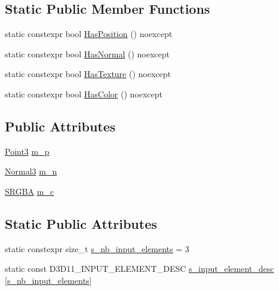 \subsection*{Static Public Member Functions}
\begin{DoxyCompactItemize}
\item 
static constexpr bool \hyperlink{structmage_1_1_vertex_position_normal_color_ae5e4ff514524b532f8c148a2f7e2cf8d}{Has\+Position} () noexcept
\item 
static constexpr bool \hyperlink{structmage_1_1_vertex_position_normal_color_a89924fd28326ffbe05b3b096f713937d}{Has\+Normal} () noexcept
\item 
static constexpr bool \hyperlink{structmage_1_1_vertex_position_normal_color_a9939ce4300e6dd0402abd299f55435ef}{Has\+Texture} () noexcept
\item 
static constexpr bool \hyperlink{structmage_1_1_vertex_position_normal_color_ab59f21c8f7ae5cef563365fc9b7d34c7}{Has\+Color} () noexcept
\end{DoxyCompactItemize}
\subsection*{Public Attributes}
\begin{DoxyCompactItemize}
\item 
\hyperlink{structmage_1_1_point3}{Point3} \hyperlink{structmage_1_1_vertex_position_normal_color_a4e5a4dff047da3d9b433a52d11584b54}{m\+\_\+p}
\item 
\hyperlink{structmage_1_1_normal3}{Normal3} \hyperlink{structmage_1_1_vertex_position_normal_color_aea2aa7191c054a17093310c20201020b}{m\+\_\+n}
\item 
\hyperlink{structmage_1_1_s_r_g_b_a}{S\+R\+G\+BA} \hyperlink{structmage_1_1_vertex_position_normal_color_a7d294a529c50b10832436dc456433a71}{m\+\_\+c}
\end{DoxyCompactItemize}
\subsection*{Static Public Attributes}
\begin{DoxyCompactItemize}
\item 
static constexpr size\+\_\+t \hyperlink{structmage_1_1_vertex_position_normal_color_ade9c12dfa6b8a61b58e0779e39d52801}{s\+\_\+nb\+\_\+input\+\_\+elements} = 3
\item 
static const D3\+D11\+\_\+\+I\+N\+P\+U\+T\+\_\+\+E\+L\+E\+M\+E\+N\+T\+\_\+\+D\+E\+SC \hyperlink{structmage_1_1_vertex_position_normal_color_a1d14ae159608683093a33b38fb6259e4}{s\+\_\+input\+\_\+element\+\_\+desc} \mbox{[}\hyperlink{structmage_1_1_vertex_position_normal_color_ade9c12dfa6b8a61b58e0779e39d52801}{s\+\_\+nb\+\_\+input\+\_\+elements}\mbox{]}
\end{DoxyCompactItemize}


